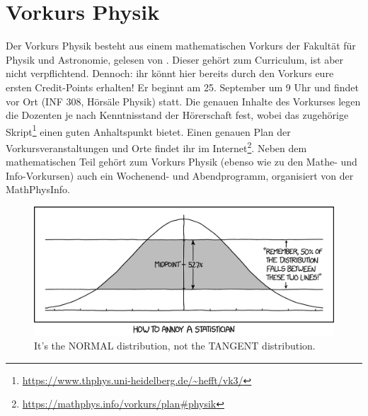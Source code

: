 \section{Vorkurs Physik}
Der Vorkurs Physik besteht aus einem mathematischen Vorkurs der Fakultät für Physik und Astronomie, gelesen von \dozentvorkurs. Dieser gehört zum Curriculum, ist aber nicht verpflichtend. Dennoch: ihr könnt hier bereits durch den Vorkurs eure ersten Credit-Points erhalten! Er beginnt am 25. September um 9 Uhr und findet vor Ort (INF 308, Hörsäle Physik) statt. Die genauen Inhalte des Vorkurses legen die Dozenten je nach Kenntnisstand der Hörerschaft fest, wobei das zugehörige Skript\footnote{\url{https://www.thphys.uni-heidelberg.de/~hefft/vk3/}} einen guten Anhaltspunkt bietet. Einen genauen Plan der Vorkursveranstaltungen und Orte findet ihr im Internet\footnote{\label{physik-vorkursplan}\url{https://mathphys.info/vorkurs/plan\#physik}}. Neben dem mathematischen Teil gehört zum Vorkurs Physik (ebenso wie zu den Mathe- und Info-Vorkursen) auch ein Wochenend- und Abendprogramm, organisiert von der MathPhysInfo.


\begin{figure}[!b]
    \centering
    \includegraphics[width=\textwidth]{bilder/normal_distribution_2x.png}
    \caption*{It's the NORMAL distribution, not the TANGENT distribution.}
\end{figure}
